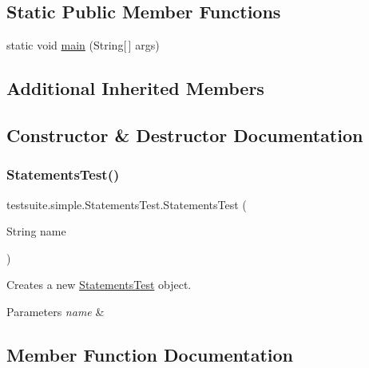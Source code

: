 \subsection*{Static Public Member Functions}
\begin{DoxyCompactItemize}
\item 
static void \mbox{\hyperlink{classtestsuite_1_1simple_1_1_statements_test_a7b3157e30ba5311864b8bb36c8506f47}{main}} (String\mbox{[}$\,$\mbox{]} args)
\end{DoxyCompactItemize}
\subsection*{Additional Inherited Members}


\subsection{Constructor \& Destructor Documentation}
\mbox{\label{classtestsuite_1_1simple_1_1_statements_test_a7cfee1c515cf25d0fa2f99e45a10c76b}} 
\subsubsection{\texorpdfstring{Statements\+Test()}{StatementsTest()}}
{\footnotesize\ttfamily testsuite.\+simple.\+Statements\+Test.\+Statements\+Test (\begin{DoxyParamCaption}\item[{String}]{name }\end{DoxyParamCaption})}

Creates a new \mbox{\hyperlink{classtestsuite_1_1simple_1_1_statements_test}{Statements\+Test}} object.


\begin{DoxyParams}{Parameters}
{\em name} & \\
\hline
\end{DoxyParams}


\subsection{Member Function Documentation}
\mbox{\label{classtestsuite_1_1simple_1_1_statements_test_a7b3157e30ba5311864b8bb36c8506f47}} 
